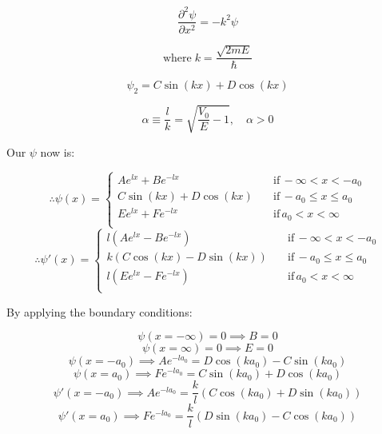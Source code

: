 \documentclass[12pt]{article}
\begin{document}
\begin{enumerate}
          \[
              \frac{\partial^2 \psi}{\partial x^2} = - k^2 \psi
          \]

          \[
              \text{where}\; k = \frac{\sqrt{2m E}}{\hbar}
          \]

          \[
              \psi_2 = C \sin{(k x)} + D \cos{(k x)}
          \]

          \[
              \alpha \equiv \frac{l}{k} = \sqrt{\frac{V_0}{E} - 1},\quad \alpha > 0
          \]

          Our $\psi$ now is:

          \begin{equation*}
              \therefore
              \psi(x) =
              \begin{cases}
                  A e^{l x} + B e^{- l x} \quad       & \text{if} \, -\infty < x < -a_0   \\
                  C \sin{(k x)} + D \cos{(k x)} \quad & \text{if} \, -a_0 \leq x \leq a_0 \\
                  E e^{l x} + F e^{- l x} \quad       & \text{if} \, a_0 < x < \infty     \\
              \end{cases}
          \end{equation*}
          \begin{equation*}
              \therefore
              \psi'(x) =
              \begin{cases}
                  l (A e^{l x} - B e^{- l x}) \quad       & \text{if} \, -\infty < x < -a_0   \\
                  k (C \cos{(k x)} - D \sin{(k x)}) \quad & \text{if} \, -a_0 \leq x \leq a_0 \\
                  l (E e^{l x} - F e^{- l x}) \quad       & \text{if} \, a_0 < x < \infty     \\
              \end{cases}
          \end{equation*}

          By applying the boundary conditions:

          \[
              \psi(x = -\infty) = 0 \implies B = 0
          \]
          \[
              \psi(x = \infty) = 0 \implies E = 0
          \]
          \[
              \psi(x = -a_0) \implies A e^{- l a_0} = D \cos{(k a_0)} - C \sin{(k a_0)} \tag{1}\label{equ.1}
          \]
          \[
              \psi(x = a_0) \implies F e^{- l a_0} = C \sin{(k a_0)} + D \cos{(k a_0)} \tag{2}\label{equ.2}
          \]
          \[
              \psi'(x = -a_0) \implies A e^{- l a_0} = \frac{k}{l} (C \cos{(k a_0)} + D \sin{(k a_0)}) \tag{3}\label{equ.3}
          \]
          \[
              \psi'(x = a_0) \implies F e^{- l a_0} = \frac{k}{l} (D \sin{(k a_0)} - C \cos{(k a_0)}) \tag{4}\label{equ.4}
          \]


\end{enumerate}
\end{document}
